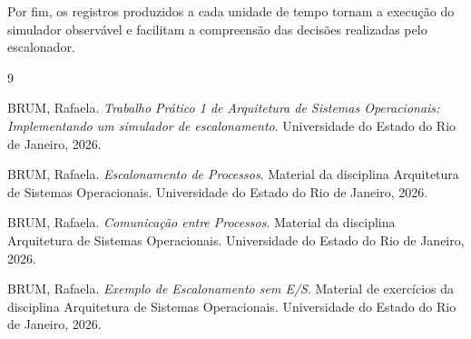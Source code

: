 \documentclass[12pt,a4paper]{article}
\begin{document}
Por fim, os registros produzidos a cada unidade de tempo tornam a
execução do simulador observável e facilitam a compreensão das
decisões realizadas pelo escalonador.



\newpage

\begin{thebibliography}{9}

BRUM, Rafaela.
\textit{Trabalho Prático 1 de Arquitetura de Sistemas Operacionais:
Implementando um simulador de escalonamento}.
Universidade do Estado do Rio de Janeiro, 2026.

BRUM, Rafaela.
\textit{Escalonamento de Processos}.
Material da disciplina Arquitetura de Sistemas Operacionais.
Universidade do Estado do Rio de Janeiro, 2026.

BRUM, Rafaela.
\textit{Comunicação entre Processos}.
Material da disciplina Arquitetura de Sistemas Operacionais.
Universidade do Estado do Rio de Janeiro, 2026.

BRUM, Rafaela.
\textit{Exemplo de Escalonamento sem E/S}.
Material de exercícios da disciplina Arquitetura de Sistemas
Operacionais.
Universidade do Estado do Rio de Janeiro, 2026.

\end{thebibliography}
\end{document}
